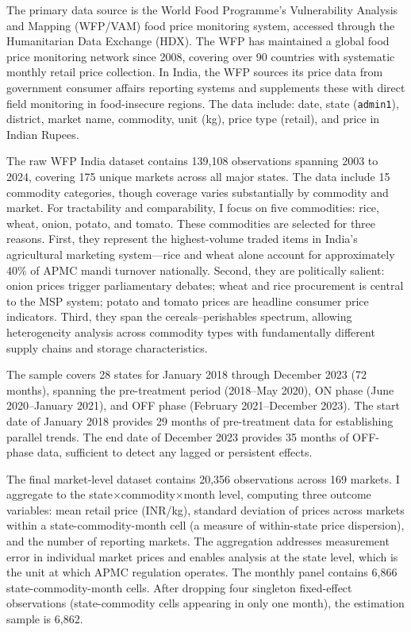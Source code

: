 \documentclass[12pt]{article}
\begin{document}
The primary data source is the World Food Programme's Vulnerability Analysis and Mapping (WFP/VAM) food price monitoring system, accessed through the Humanitarian Data Exchange (HDX). The WFP has maintained a global food price monitoring network since 2008, covering over 90 countries with systematic monthly retail price collection. In India, the WFP sources its price data from government consumer affairs reporting systems and supplements these with direct field monitoring in food-insecure regions. The data include: date, state (\texttt{admin1}), district, market name, commodity, unit (kg), price type (retail), and price in Indian Rupees.

The raw WFP India dataset contains 139,108 observations spanning 2003 to 2024, covering 175 unique markets across all major states. The data include 15 commodity categories, though coverage varies substantially by commodity and market. For tractability and comparability, I focus on five commodities: rice, wheat, onion, potato, and tomato. These commodities are selected for three reasons. First, they represent the highest-volume traded items in India's agricultural marketing system---rice and wheat alone account for approximately 40\% of APMC mandi turnover nationally. Second, they are politically salient: onion prices trigger parliamentary debates; wheat and rice procurement is central to the MSP system; potato and tomato prices are headline consumer price indicators. Third, they span the cereals--perishables spectrum, allowing heterogeneity analysis across commodity types with fundamentally different supply chains and storage characteristics.

The sample covers 28 states for January 2018 through December 2023 (72 months), spanning the pre-treatment period (2018--May 2020), ON phase (June 2020--January 2021), and OFF phase (February 2021--December 2023). The start date of January 2018 provides 29 months of pre-treatment data for establishing parallel trends. The end date of December 2023 provides 35 months of OFF-phase data, sufficient to detect any lagged or persistent effects.

The final market-level dataset contains 20,356 observations across 169 markets. I aggregate to the state$\times$commodity$\times$month level, computing three outcome variables: mean retail price (INR/kg), standard deviation of prices across markets within a state-commodity-month cell (a measure of within-state price dispersion), and the number of reporting markets. The aggregation addresses measurement error in individual market prices and enables analysis at the state level, which is the unit at which APMC regulation operates. The monthly panel contains 6,866 state-commodity-month cells. After dropping four singleton fixed-effect observations (state-commodity cells appearing in only one month), the estimation sample is 6,862.
\end{document}
